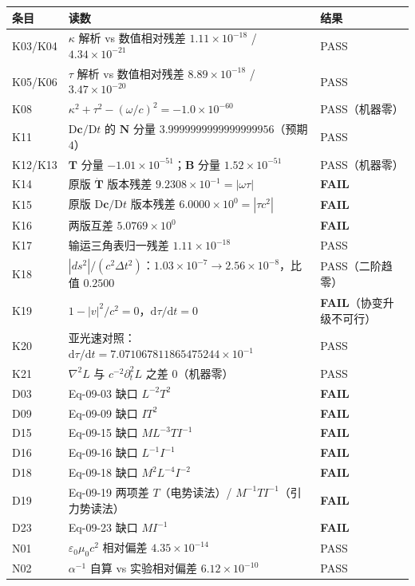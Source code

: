 \documentclass[UTF8,fontset=fandol,11pt]{ctexart}
\newcommand{\dd}{\mathrm{d}}
\newcommand{\DD}{\mathrm{D}}
\newcommand{\bx}{\boldsymbol}
\begin{document}
\begin{center}
\begin{tabular}{p{1.6cm}p{9.2cm}p{3.4cm}}
\toprule
条目 & 读数 & 结果 \\
\midrule
K03/K04 & $\kappa$ 解析 vs 数值相对残差 $1.11\times10^{-18}$ / $4.34\times10^{-21}$ & PASS \\
K05/K06 & $\tau$ 解析 vs 数值相对残差 $8.89\times10^{-18}$ / $3.47\times10^{-20}$ & PASS \\
K08 & $\kappa^2+\tau^2-(\omega/c)^2=-1.0\times10^{-60}$ & PASS（机器零） \\
K11 & $\DD\bx c/\DD t$ 的 $\bx N$ 分量 $3.9999999999999999956$（预期 $4$） & PASS \\
K12/K13 & $\bx T$ 分量 $-1.01\times10^{-51}$；$\bx B$ 分量 $1.52\times10^{-51}$ & PASS（机器零） \\
K14 & 原版 $\dot{\bx T}$ 版本残差 $9.2308\times10^{-1}=|\omega\tau|$ & \textbf{FAIL} \\
K15 & 原版 $\DD\bx c/\DD t$ 版本残差 $6.0000\times10^{0}=|\tau c^2|$ & \textbf{FAIL} \\
K16 & 两版互差 $5.0769\times10^{0}$ & \textbf{FAIL} \\
K17 & 输运三角表归一残差 $1.11\times10^{-18}$ & PASS \\
K18 & $|ds^2|/(c^2\Delta t^2)$：$1.03\times10^{-7}\to2.56\times10^{-8}$，比值 $0.2500$ & PASS（二阶趋零） \\
K19 & $1-|v|^2/c^2=0$，$\dd\tau/\dd t=0$ & \textbf{FAIL}（协变升级不可行） \\
K20 & 亚光速对照：$\dd\tau/\dd t=7.071067811865475244\times10^{-1}$ & PASS \\
K21 & $\nabla^2L$ 与 $c^{-2}\partial_t^2L$ 之差 $0$（机器零） & PASS \\
D03 & Eq-09-03 缺口 $L^{-2}T^2$ & \textbf{FAIL} \\
D09 & Eq-09-09 缺口 $IT^2$ & \textbf{FAIL} \\
D15 & Eq-09-15 缺口 $ML^{-3}TI^{-1}$ & \textbf{FAIL} \\
D16 & Eq-09-16 缺口 $L^{-1}I^{-1}$ & \textbf{FAIL} \\
D18 & Eq-09-18 缺口 $M^2L^{-4}I^{-2}$ & \textbf{FAIL} \\
D19 & Eq-09-19 两项差 $T$（电势读法）/ $M^{-1}TI^{-1}$（引力势读法） & \textbf{FAIL} \\
D23 & Eq-09-23 缺口 $MI^{-1}$ & \textbf{FAIL} \\
N01 & $\varepsilon_0\mu_0c^2$ 相对偏差 $4.35\times10^{-14}$ & PASS \\
N02 & $\alpha^{-1}$ 自算 vs 实验相对偏差 $6.12\times10^{-10}$ & PASS \\

\end{tabular}
\end{center}
\end{document}
